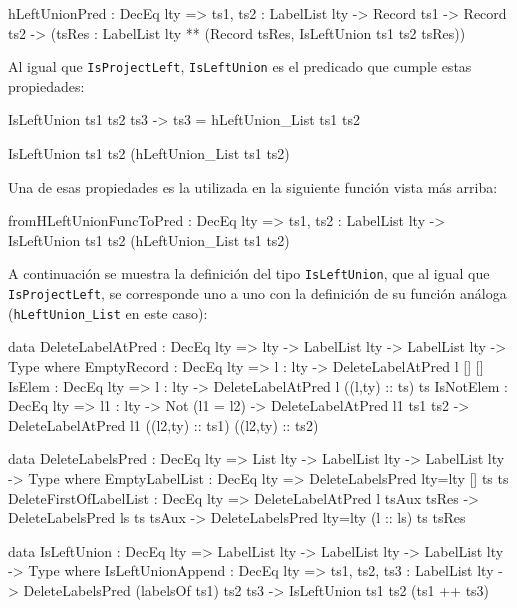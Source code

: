 \begin{code}
hLeftUnionPred : DecEq lty => {ts1, ts2 : LabelList lty} -> 
  Record ts1 -> Record ts2 ->
  (tsRes : LabelList lty ** (Record tsRes, 
    IsLeftUnion ts1 ts2 tsRes))
\end{code}

Al igual que \texttt{IsProjectLeft}, \texttt{IsLeftUnion} es el predicado que cumple estas propiedades:

\begin{code}
IsLeftUnion ts1 ts2 ts3 -> ts3 = hLeftUnion_List ts1 ts2

IsLeftUnion ts1 ts2 (hLeftUnion_List ts1 ts2)
\end{code}

Una de esas propiedades es la utilizada en la siguiente función vista más arriba:

\begin{code}
fromHLeftUnionFuncToPred : DecEq lty => 
  {ts1, ts2 : LabelList lty} -> 
  IsLeftUnion ts1 ts2 (hLeftUnion_List ts1 ts2)  
\end{code}

A continuación se muestra la definición del tipo \texttt{IsLeftUnion}, que al igual que \texttt{IsProjectLeft}, se corresponde uno a uno con la definición de su función análoga (\texttt{hLeftUnion\_List} en este caso):

\begin{code}
data DeleteLabelAtPred : DecEq lty => lty -> LabelList lty -> 
  LabelList lty -> Type where
  EmptyRecord : DecEq lty => {l : lty} -> 
    DeleteLabelAtPred l [] []
  IsElem : DecEq lty => {l : lty} -> 
    DeleteLabelAtPred l ((l,ty) :: ts) ts
  IsNotElem : DecEq lty => {l1 : lty} -> Not (l1 = l2) -> 
    DeleteLabelAtPred l1 ts1 ts2 -> 
    DeleteLabelAtPred l1 ((l2,ty) :: ts1) ((l2,ty) :: ts2)

data DeleteLabelsPred : DecEq lty => List lty -> LabelList lty -> 
  LabelList lty -> Type where
  EmptyLabelList : DecEq lty =>  
    DeleteLabelsPred {lty=lty} [] ts ts
  DeleteFirstOfLabelList : DecEq lty => 
    DeleteLabelAtPred l tsAux tsRes -> 
    DeleteLabelsPred ls ts tsAux ->
    DeleteLabelsPred {lty=lty} (l :: ls) ts tsRes

data IsLeftUnion : DecEq lty => LabelList lty -> LabelList lty -> 
  LabelList lty -> Type where
  IsLeftUnionAppend : DecEq lty => 
    {ts1, ts2, ts3 : LabelList lty} -> 
    DeleteLabelsPred (labelsOf ts1) ts2 ts3 -> 
    IsLeftUnion ts1 ts2 (ts1 ++ ts3)
\end{code}


